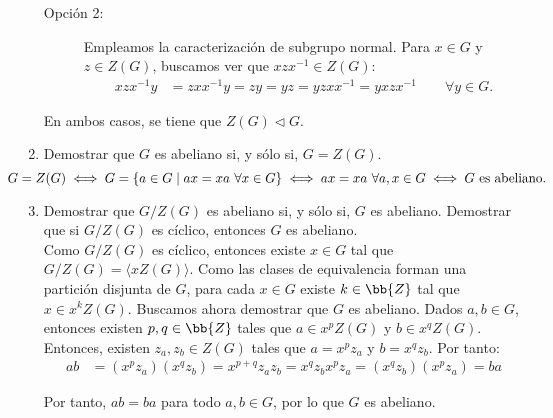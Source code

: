\begin{ejercicio}
\begin{enumerate}
\begin{description}
            \item[Opción 2:]
            Empleamos la caracterización de subgrupo normal. Para $x\in G$ y $z\in Z(G)$, buscamos ver que $xzx^{-1}\in Z(G)$:
            \begin{align*}
                xzx^{-1}y &= zxx^{-1}y = zy = yz = yzxx^{-1} = yxzx^{-1}\qquad \forall y\in G.
            \end{align*}
        \end{description}
        En ambos casos, se tiene que $Z(G)\lhd G$.
        \item Demostrar que $G$ es abeliano si, y sólo si, $G=Z(G)$.
        \begin{equation*}
            \hspace{-1cm}G=Z(G) \iff G=\{a\in G\mid ax=xa\ \forall x\in G\} \iff ax=xa\ \forall a,x\in G \iff G\text{ es abeliano.}
        \end{equation*}
        \item\label{ej:4.4.4} Demostrar que $G/Z(G)$ es abeliano si, y sólo si, $G$ es abeliano.
        Demostrar que si $G/Z(G)$ es cíclico, entonces $G$ es abeliano.\\
        
        Como $G/Z(G)$ es cíclico, entonces existe $x\in G$ tal que $G/Z(G)=\langle xZ(G)\rangle$. 
        Como las clases de equivalencia forman una partición disjunta de $G$, para cada $x\in G$ existe $k\in \bb{Z}$ tal que $x\in x^kZ(G)$. Buscamos ahora demostrar que $G$ es abeliano. Dados $a,b\in G$, entonces existen $p,q\in \bb{Z}$ tales que $a\in x^pZ(G)$ y $b\in x^qZ(G)$. Entonces, existen $z_a,z_b\in Z(G)$ tales que $a=x^pz_a$ y $b=x^qz_b$. Por tanto:
        \begin{align*}
            ab &= (x^pz_a)(x^qz_b) = x^{p+q}z_az_b = x^qz_b x^pz_a = (x^qz_b)(x^pz_a) = ba
        \end{align*}

        Por tanto, $ab=ba$ para todo $a,b\in G$, por lo que $G$ es abeliano.        
    \end{enumerate}
\end{ejercicio}

